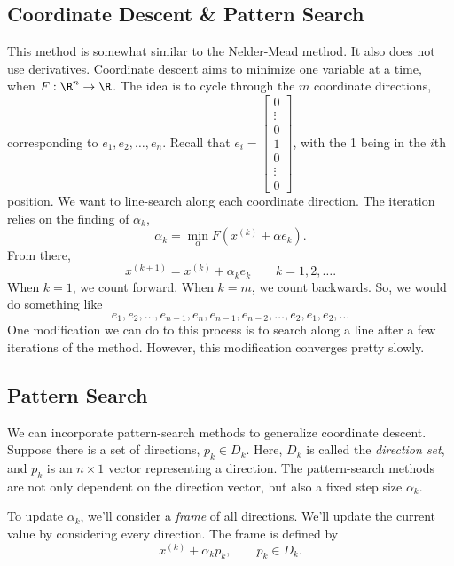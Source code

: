 \documentclass[letterpaper]{article}
\begin{document}
\subsection{Coordinate Descent \& Pattern Search}
This method is somewhat similar to the Nelder-Mead method. It also does not use derivatives. Coordinate descent aims to minimize one variable at a time, when $F: \R^n \to \R$. The idea is to cycle through the $m$ coordinate directions, corresponding to $e_1, e_2, \hdots, e_n$. Recall that $e_i = \begin{bmatrix}
    0 \\ \vdots \\ 0 \\ 1 \\ 0 \\ \vdots \\ 0
\end{bmatrix}$, with the 1 being in the $i$th position. We want to line-search along each coordinate direction. The iteration relies on the finding of $\alpha_k$, 
\[\alpha_k = \min_{\alpha} F(x^{(k)} + \alpha e_k).\]
From there, \[x^{(k + 1)} = x^{(k)} + \alpha_k e_k \qquad k = 1, 2, \hdots.\]
When $k = 1$, we count forward. When $k = m$, we count backwards. So, we would do something like 
\[e_1, e_2, \hdots, e_{n - 1}, e_n, e_{n - 1}, e_{n - 2}, \hdots, e_2, e_1, e_2, \hdots\]
One modification we can do to this process is to search along a line after a few iterations of the method. However, this modification converges pretty slowly. 

\subsection{Pattern Search}
We can incorporate pattern-search methods to generalize coordinate descent. Suppose there is a set of directions, $p_k \in D_k$. Here, $D_k$ is called the \emph{direction set}, and $p_k$ is an $n \times 1$ vector representing a direction. The pattern-search methods are not only dependent on the direction vector, but also a fixed step size $\alpha_k$. 

\bigskip 

To update $\alpha_k$, we'll consider a \emph{frame} of all directions. We'll update the current value by considering every direction. The frame is defined by 
\[x^{(k)} + \alpha_k p_k, \qquad p_k \in D_k.\]
\end{document}
